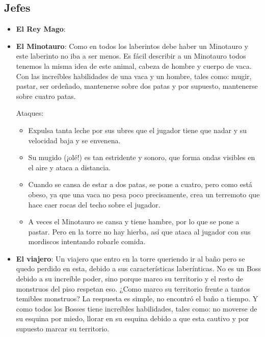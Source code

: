 \subsection{Jefes}

\begin{itemize}
    \item \textbf{El Rey Mago}: %

    \item \textbf{El Minotauro}: Como en todos los laberintos debe haber un Minotauro y este laberinto no iba a ser menos. Es fácil describir a un Minotauro todos tenemos la misma idea de este animal, cabeza de hombre y cuerpo de vaca. Con las increíbles habilidades de una vaca y un hombre, tales como: mugir, pastar, ser ordeñado, mantenerse sobre dos patas y por supuesto, mantenerse sobre cuatro patas.
    
    Ataques:
    \begin{itemize}
        \item Expulsa tanta leche por sus ubres que el jugador tiene que nadar y su velocidad baja y se envenena.
        \item Su mugido (¡olé!) es tan estridente y sonoro, que forma ondas visibles en el aire y ataca a distancia.
        \item Cuando se cansa de estar a dos patas, se pone a cuatro, pero como está obeso, ya que una vaca no pesa poco precisamente, crea un terremoto que hace caer rocas del techo sobre el jugador.
        \item A veces el Minotauro se cansa y tiene hambre, por lo que se pone a pastar. Pero en la torre no hay hierba, así que ataca al jugador con sus mordiscos intentando robarle comida.
    \end{itemize}

    \item \textbf{El viajero}: Un viajero que entro en la torre queriendo ir al baño pero se quedo perdido en esta, debido a sus características laberínticas. No es un Boss debido a su increíble poder, sino porque marco su territorio y el resto de monstruos del piso respetan eso. ¿Como marco su territorio frente a tantos temibles monstruos? La respuesta es simple, no encontró el baño a tiempo. Y como todos los Bosses tiene increíbles habilidades, tales como: no moverse de su esquina por miedo, llorar en su esquina debido a que esta cautivo y por supuesto marcar su territorio.
    

\end{itemize}
